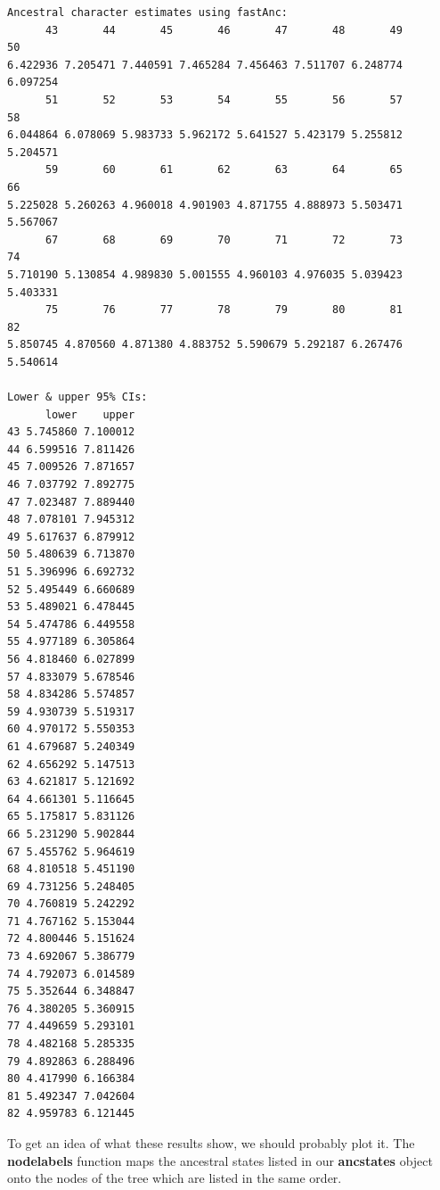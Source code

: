 \documentclass[
]{book}
\newenvironment{Shaded}{\begin{snugshade}}{\end{snugshade}}
\newcommand{\DataTypeTok}[1]{\textcolor[rgb]{0.13,0.29,0.53}{#1}}
\newcommand{\DecValTok}[1]{\textcolor[rgb]{0.00,0.00,0.81}{#1}}
\newcommand{\FloatTok}[1]{\textcolor[rgb]{0.00,0.00,0.81}{#1}}
\newcommand{\KeywordTok}[1]{\textcolor[rgb]{0.13,0.29,0.53}{\textbf{#1}}}
\newcommand{\NormalTok}[1]{#1}
\newcommand{\OperatorTok}[1]{\textcolor[rgb]{0.81,0.36,0.00}{\textbf{#1}}}
\newcommand{\OtherTok}[1]{\textcolor[rgb]{0.56,0.35,0.01}{#1}}
\begin{document}
\begin{verbatim}
Ancestral character estimates using fastAnc:
      43       44       45       46       47       48       49       50 
6.422936 7.205471 7.440591 7.465284 7.456463 7.511707 6.248774 6.097254 
      51       52       53       54       55       56       57       58 
6.044864 6.078069 5.983733 5.962172 5.641527 5.423179 5.255812 5.204571 
      59       60       61       62       63       64       65       66 
5.225028 5.260263 4.960018 4.901903 4.871755 4.888973 5.503471 5.567067 
      67       68       69       70       71       72       73       74 
5.710190 5.130854 4.989830 5.001555 4.960103 4.976035 5.039423 5.403331 
      75       76       77       78       79       80       81       82 
5.850745 4.870560 4.871380 4.883752 5.590679 5.292187 6.267476 5.540614 

Lower & upper 95% CIs:
      lower    upper
43 5.745860 7.100012
44 6.599516 7.811426
45 7.009526 7.871657
46 7.037792 7.892775
47 7.023487 7.889440
48 7.078101 7.945312
49 5.617637 6.879912
50 5.480639 6.713870
51 5.396996 6.692732
52 5.495449 6.660689
53 5.489021 6.478445
54 5.474786 6.449558
55 4.977189 6.305864
56 4.818460 6.027899
57 4.833079 5.678546
58 4.834286 5.574857
59 4.930739 5.519317
60 4.970172 5.550353
61 4.679687 5.240349
62 4.656292 5.147513
63 4.621817 5.121692
64 4.661301 5.116645
65 5.175817 5.831126
66 5.231290 5.902844
67 5.455762 5.964619
68 4.810518 5.451190
69 4.731256 5.248405
70 4.760819 5.242292
71 4.767162 5.153044
72 4.800446 5.151624
73 4.692067 5.386779
74 4.792073 6.014589
75 5.352644 6.348847
76 4.380205 5.360915
77 4.449659 5.293101
78 4.482168 5.285335
79 4.892863 6.288496
80 4.417990 6.166384
81 5.492347 7.042604
82 4.959783 6.121445
\end{verbatim}

To get an idea of what these results show, we should probably plot it. The \textbf{nodelabels} function maps the ancestral states listed in our \textbf{ancstates} object onto the nodes of the tree which are listed in the same order.

\begin{Shaded}
\end{Shaded}
\end{document}
